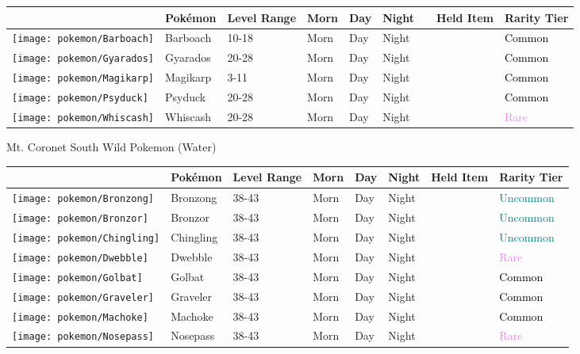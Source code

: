 \begin{longtable}{||l l l l l l l l l||}%
\hline%
&Pokémon&Level Range&Morn&Day&Night&&Held Item&Rarity Tier\\%
\hline%
\endhead%
\hline%
\texttt{[image: pokemon/Barboach]}&Barboach&10{-}18&Morn&Day&Night&&&\textcolor{black}{%
Common%
}\\%
\hline%
\texttt{[image: pokemon/Gyarados]}&Gyarados&20{-}28&Morn&Day&Night&&&\textcolor{black}{%
Common%
}\\%
\hline%
\texttt{[image: pokemon/Magikarp]}&Magikarp&3{-}11&Morn&Day&Night&&&\textcolor{black}{%
Common%
}\\%
\hline%
\texttt{[image: pokemon/Psyduck]}&Psyduck&20{-}28&Morn&Day&Night&&&\textcolor{black}{%
Common%
}\\%
\hline%
\texttt{[image: pokemon/Whiscash]}&Whiscash&20{-}28&Morn&Day&Night&&&\textcolor{violet}{%
Rare%
}\\%
\hline%
\end{longtable}%
\caption{Mt. Coronet South Wild Pokemon (Water)}%
\begin{longtable}{||l l l l l l l l||}%
\hline%
&Pokémon&Level Range&Morn&Day&Night&Held Item&Rarity Tier\\%
\hline%
\endhead%
\hline%
\texttt{[image: pokemon/Bronzong]}&Bronzong&38{-}43&Morn&Day&Night&&\textcolor{teal}{%
Uncommon%
}\\%
\hline%
\texttt{[image: pokemon/Bronzor]}&Bronzor&38{-}43&Morn&Day&Night&&\textcolor{teal}{%
Uncommon%
}\\%
\hline%
\texttt{[image: pokemon/Chingling]}&Chingling&38{-}43&Morn&Day&Night&&\textcolor{teal}{%
Uncommon%
}\\%
\hline%
\texttt{[image: pokemon/Dwebble]}&Dwebble&38{-}43&Morn&Day&Night&&\textcolor{violet}{%
Rare%
}\\%
\hline%
\texttt{[image: pokemon/Golbat]}&Golbat&38{-}43&Morn&Day&Night&&\textcolor{black}{%
Common%
}\\%
\hline%
\texttt{[image: pokemon/Graveler]}&Graveler&38{-}43&Morn&Day&Night&&\textcolor{black}{%
Common%
}\\%
\hline%
\texttt{[image: pokemon/Machoke]}&Machoke&38{-}43&Morn&Day&Night&&\textcolor{black}{%
Common%
}\\%
\hline%
\texttt{[image: pokemon/Nosepass]}&Nosepass&38{-}43&Morn&Day&Night&&\textcolor{violet}{%
Rare%
}\\%
\hline%
\end{longtable}%
